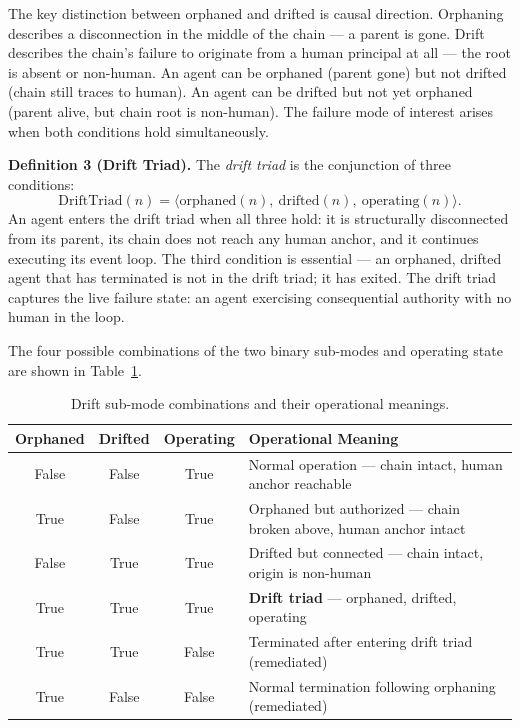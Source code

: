 The key distinction between orphaned and drifted is causal direction. Orphaning describes a disconnection in the middle of the chain — a parent is gone. Drift describes the chain's failure to originate from a human principal at all — the root is absent or non-human. An agent can be orphaned (parent gone) but not drifted (chain still traces to human). An agent can be drifted but not yet orphaned (parent alive, but chain root is non-human). The failure mode of interest arises when both conditions hold simultaneously.

\medskip
\noindent\textbf{Definition 3 (Drift Triad).}
The \emph{drift triad} is the conjunction of three conditions:
\begin{equation}
\mathrm{DriftTriad}(n) = \langle \mathrm{orphaned}(n),\ \mathrm{drifted}(n),\ \mathrm{operating}(n) \rangle.
\label{eq:rs-drift-triad}
\end{equation}
An agent enters the drift triad when all three hold: it is structurally disconnected from its parent, its chain does not reach any human anchor, and it continues executing its event loop. The third condition is essential — an orphaned, drifted agent that has terminated is not in the drift triad; it has exited. The drift triad captures the live failure state: an agent exercising consequential authority with no human in the loop.

The four possible combinations of the two binary sub-modes and operating state are shown in Table~\ref{tab:rs-drift-submodes}.

\begin{table}[h]
\centering
\begin{tabular}{c|c|c|p{5cm}}
\textbf{Orphaned} & \textbf{Drifted} & \textbf{Operating} & \textbf{Operational Meaning} \\ \hline
False & False & True  & Normal operation — chain intact, human anchor reachable \\
True  & False & True  & Orphaned but authorized — chain broken above, human anchor intact \\
False & True  & True  & Drifted but connected — chain intact, origin is non-human \\
True  & True  & True  & \textbf{Drift triad} — orphaned, drifted, operating \\
True  & True  & False & Terminated after entering drift triad (remediated) \\
True  & False & False & Normal termination following orphaning (remediated)
\end{tabular}
\caption{Drift sub-mode combinations and their operational meanings.}
\label{tab:rs-drift-submodes}
\end{table}

